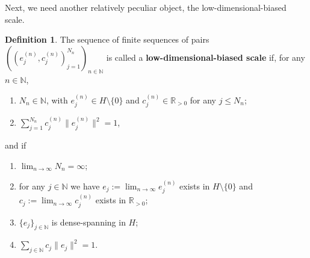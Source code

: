 \documentclass{amsart}
\theoremstyle{definition}
\newtheorem{defn}[thm]{Definition}
\theoremstyle{remark}
\newcounter{pointnumber}
\begin{document}
Next, we need another relatively peculiar object, the low-dimensional-biased scale.
\begin{defn}\label{definition_scale}
	The sequence of finite sequences of pairs $((e_j^{(n)},c_j^{(n)})_{j=1}^{N_n})_{n\in\mathbb{N}}$ is called a \textbf{low-dimensional-biased scale} if, for any $n\in\mathbb{N}$,
	\begin{enumerate}
		\setcounter{enumi}{\value{pointnumber}}
		\item\label{property_scale_elements} $N_n\in\mathbb{N}$, with $e_j^{(n)}\in H\setminus\{0\}$ and $c_j^{(n)}\in\mathbb{R}_{>0}$ for any $j\leq N_n$;
		\item\label{property_scale_proba} $\sum_{j=1}^{N_n}c_j^{(n)}\|e_j^{(n)}\|^2=1$,
		\setcounter{pointnumber}{\value{enumi}}
	\end{enumerate}
	and if
	\begin{enumerate}
		\setcounter{enumi}{\value{pointnumber}}
		\item\label{property_scale_infinity} $\lim_{n\rightarrow\infty}N_n=\infty$;
		\item\label{property_scale_limits}  for any $j\in\mathbb{N}$ we have $e_j:=\lim_{n\rightarrow\infty} e_j^{(n)}$ exists in $H\setminus\{0\}$ and $c_j:=\lim_{n\rightarrow\infty}c_j^{(n)}$ exists in $\mathbb{R}_{>0}$;
		\item\label{property_scale_dense} $\{e_j\}_{j\in\mathbb{N}}$ is dense-spanning in $H$;
		\item\label{property_scale_bias} $\sum_{j\in\mathbb{N}}c_j\|e_j\|^2=1.$
		\setcounter{pointnumber}{\value{enumi}}
	\end{enumerate}
\end{defn}
\end{document}
